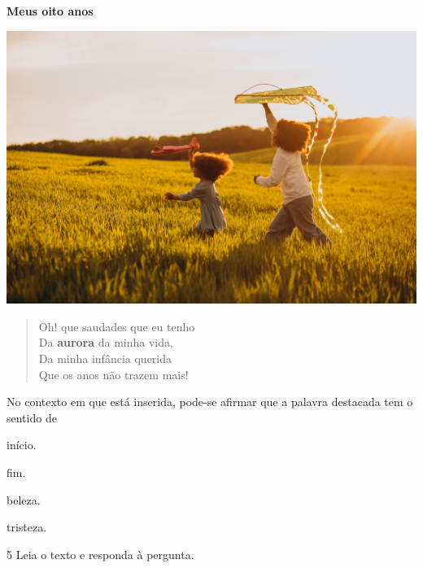 \begin{myquote}
\textbf{Meus oito anos}

\begin{center}
\includegraphics[width=.8\textwidth]{media/image47.jpg}
\end{center}

\begin{verse}
Oh! que saudades que eu tenho\\
Da \textbf{aurora} da minha vida,\\
Da minha infância querida\\
Que os anos não trazem mais! 
\end{verse}

\end{myquote}

No contexto em que está inserida, pode-se afirmar que a palavra destacada
tem o sentido de

\begin{multicols}{2}
\begin{escolha}
  \item início.
  \item fim.
  \item beleza.
  \item tristeza.
\end{escolha} 
\end{multicols}

\pagebreak
\num{5} Leia o texto e responda à pergunta.


